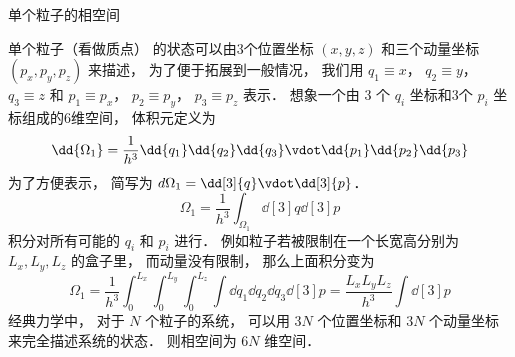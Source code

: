 
单个粒子的相空间

单个粒子（看做质点） 的状态可以由3个位置坐标 $(x,y,z)$ 和三个动量坐标 $(p_x, p_y, p_z)$ 来描述， 为了便于拓展到一般情况， 我们用 $q_1 \equiv x$，   $q_2 \equiv y$， $q_3 \equiv z$   和 $p_1 \equiv p_x$， $p_2 \equiv p_y$， $p_3 \equiv p_z$ 表示． 想象一个由 3 个 $q_i$  坐标和3个 $p_i$  坐标组成的6维空间， 体积元定义为
\begin{equation}
\dd{\Omega_1} = \frac{1}{h^3} \dd{q_1}\dd{q_2}\dd{q_3} \vdot \dd{p_1}\dd{p_2}\dd{p_3}
\end{equation} 
为了方便表示， 简写为  $d{\Omega_1} = \dd[3]{q} \vdot \dd[3]{p}$． 
\begin{equation}
\Omega_1 = \frac{1}{h^3} \int_{\Omega_1} \dd[3]{q} \dd[3]{p}
\end{equation} 
积分对所有可能的 $q_i$ 和 $p_i$ 进行． 例如粒子若被限制在一个长宽高分别为 $L_x, L_y, L_z$ 的盒子里， 而动量没有限制， 那么上面积分变为
\begin{equation}
\Omega_1 = \frac{1}{h^3} \int_0^{L_x} \int_0^{L_y} \int_0^{L_z} \int \dd{q_1} \dd{q_2} \dd{q_3} \dd[3]{p} = \frac{L_x L_y L_z}{h^3} \int \dd[3]{p} 
\end{equation} 
经典力学中， 对于 $N$ 个粒子的系统， 可以用 $3N$ 个位置坐标和 $3N$ 个动量坐标来完全描述系统的状态． 则相空间为 $6N$ 维空间．

